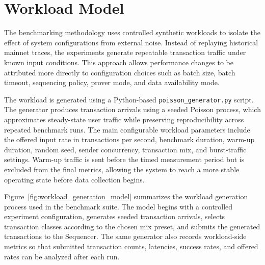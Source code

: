 
\section{Workload Model}
\label{sec:workload_model}

The benchmarking methodology uses controlled synthetic workloads to isolate the effect of system configurations from external noise. Instead of replaying historical mainnet traces, the experiments generate repeatable transaction traffic under known input conditions. This approach allows performance changes to be attributed more directly to configuration choices such as batch size, batch timeout, sequencing policy, prover mode, and data availability mode.

The workload is generated using a Python-based \texttt{poisson\_generator.py} script. The generator produces transaction arrivals using a seeded Poisson process, which approximates steady-state user traffic while preserving reproducibility across repeated benchmark runs. The main configurable workload parameters include the offered input rate in transactions per second, benchmark duration, warm-up duration, random seed, sender concurrency, transaction mix, and burst-traffic settings. Warm-up traffic is sent before the timed measurement period but is excluded from the final metrics, allowing the system to reach a more stable operating state before data collection begins.

Figure~\ref{fig:workload_generation_model} summarizes the workload generation process used in the benchmark suite. The model begins with a controlled experiment configuration, generates seeded transaction arrivals, selects transaction classes according to the chosen mix preset, and submits the generated transactions to the Sequencer. The same generator also records workload-side metrics so that submitted transaction counts, latencies, success rates, and offered rates can be analyzed after each run.

